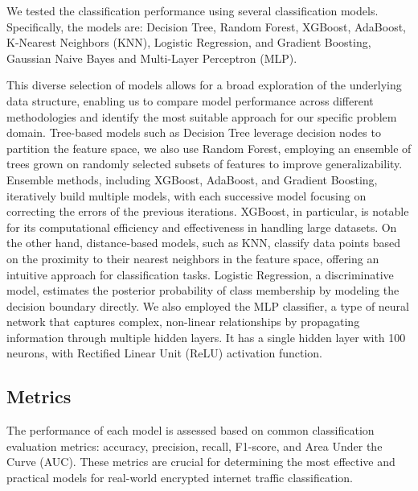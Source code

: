 \documentclass[10pt,journal]{IEEEtran}%
\begin{document}
We tested the classification performance using several classification models. Specifically, the models are: Decision Tree, Random Forest, XGBoost, AdaBoost, K-Nearest Neighbors (KNN), Logistic Regression, and Gradient Boosting, Gaussian Naive Bayes and Multi-Layer Perceptron (MLP).


This diverse selection of models allows for a broad exploration of the underlying data structure, enabling us to compare model performance across different methodologies and identify the most suitable approach for our specific problem domain.
Tree-based models such as Decision Tree leverage decision nodes to partition the feature space, we also use Random Forest, employing an ensemble of trees grown on randomly selected subsets of features to improve generalizability. Ensemble methods, including XGBoost, AdaBoost, and Gradient Boosting, iteratively build multiple models, with each successive model focusing on correcting the errors of the previous iterations. XGBoost, in particular, is notable for its computational efficiency and effectiveness in handling large datasets. On the other hand, distance-based models, such as KNN, classify data points based on the proximity to their nearest neighbors in the feature space, offering an intuitive approach for classification tasks. Logistic Regression, a discriminative model, estimates the posterior probability of class membership by modeling the decision boundary directly. We also employed the MLP classifier, a type of neural network that captures complex, non-linear relationships by propagating information through multiple hidden layers. It has a single hidden layer with 100 neurons, with Rectified Linear Unit (ReLU) activation function.

\subsection{Metrics}
The performance of each model is assessed based on common classification evaluation metrics: accuracy, precision, recall, F1-score, and Area Under the Curve (AUC). These metrics are crucial for determining the most effective and practical models for real-world encrypted internet traffic classification. 
\end{document}
